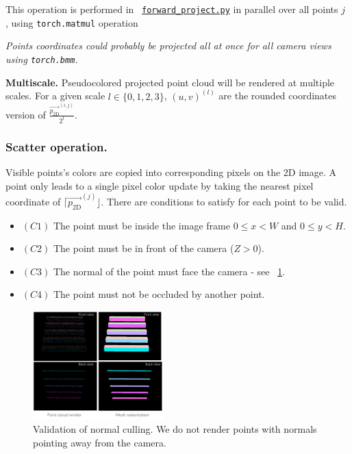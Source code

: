 This operation is performed in ~\href{https://github.com/balthazarneveu/per-pixel-point-rendering/blob/main/src/pixr/rendering/forward_project.py}{\texttt{forward\_project.py}} in parallel over all points $j$ , using \texttt{torch.matmul} operation

\noindent \textit{Points coordinates could probably be projected all at once for all camera views using \texttt{torch.bmm}.}


\noindent \textbf{Multiscale.} Pseudocolored projected point cloud will be rendered at multiple scales. For a given scale $l \in \{0, 1, 2, 3\}$, 
$(u,v)^{(l)}$ are the rounded coordinates version of $\frac{\vec{p_{\textrm{2D}}}^{(i,j)}}{2^{l}}$.

\subsubsection{Scatter operation.}
\label{sec:scatter_op}

Visible points's colors are copied into corresponding pixels on the 2D image. A point only leads to a single pixel color update by taking the nearest pixel coordinate of $\lceil\vec{p_{\textrm{2D}}}^{(j)}\rfloor$. There are conditions to satisfy for each point to be valid. 
\begin{itemize}
    \item $(C1)$ The point must be inside the image frame $0\leq x<W$ and $0\leq y <H$.
    \item $(C2)$ The point must be in front of the camera ($Z>0$).
    \item $(C3)$ The normal of the point must face the camera - see ~\cref{fig:normal_culling_validation}.
    \item $(C4)$ The point must not be occluded by another point.
\end{itemize}

\begin{figure}[htpb]
    \centering
    \includegraphics[width=0.45\textwidth]{figures/normal_culling_validation.png}
    \caption{Validation of normal culling. We do not render points with normals pointing away from the camera.}
    \label{fig:normal_culling_validation}
\end{figure}



